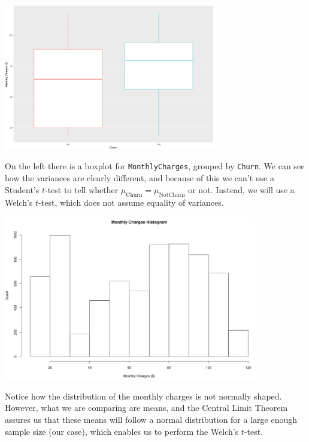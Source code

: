 \documentclass[man, floatsintext]{apa6}
\begin{document}

\noindent\begin{minipage}{0.54\textwidth}
\includegraphics[width = \linewidth, height = 64mm]{boxplot_MonthlyChargesvsChurn}
\end{minipage}
\hfill
\begin{minipage}{0.43\textwidth} On the left there is a boxplot for \texttt{MonthlyCharges}, grouped by \texttt{Churn}. We can see how the variances are clearly different, and because of this we can't use a Student's $t$-test to tell whether $\mu_{\text{Churn}} = \mu_{\text{NotChurn}}$ or not. Instead, we will use a Welch's $t$-test, which does not assume equality of variances. 
\end{minipage}


\noindent\begin{minipage}{0.54\textwidth}
\includegraphics[width = \linewidth, height = 72mm]{hist_MonthlyCharges}
\end{minipage}
\hfill
\begin{minipage}{0.43\textwidth} Notice how the distribution of the monthly charges is not normally shaped. However, what we are comparing are means, and the Central Limit Theorem assures us that these means will follow a normal distribution for a large enough sample size (our case), which enables us to perform the Welch's $t$-test. 
\end{minipage}
\end{document}
